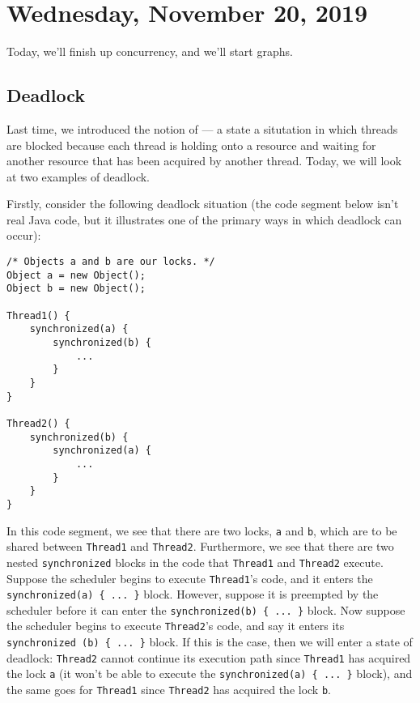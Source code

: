 \section{Wednesday, November 20, 2019}

Today, we'll finish up concurrency, and we'll start graphs.

\subsection{Deadlock}

Last time, we introduced the notion of  --- a state a situtation in which threads are blocked because each thread is holding onto a resource and waiting for another resource that has been acquired by another thread. Today, we will look at two examples of deadlock.

Firstly, consider the following deadlock situation (the code segment below isn't real Java code, but it illustrates one of the primary ways in which deadlock can occur):

\begin{lstlisting}
/* Objects a and b are our locks. */
Object a = new Object();
Object b = new Object();

Thread1() {
    synchronized(a) {
        synchronized(b) {
            ...
        }
    }
}

Thread2() {
    synchronized(b) {
        synchronized(a) {
            ...
        }
    }
}
\end{lstlisting}

In this code segment, we see that there are two locks, \verb!a! and \verb!b!, which are to be shared between \verb!Thread1! and \verb!Thread2!. Furthermore, we see that there are two nested \verb!synchronized! blocks in the code that \verb!Thread1! and \verb!Thread2! execute. Suppose the scheduler begins to execute \verb!Thread1!'s code, and it enters the \verb!synchronized(a) { ... }! block. However, suppose it is preempted by the scheduler before it can enter the \verb!synchronized(b) { ... }! block. Now suppose the scheduler begins to execute \verb!Thread2!'s code, and say it enters its \verb!synchronized (b) { ... }! block. If this is the case, then we will enter a state of deadlock: \verb!Thread2! cannot continue its execution path since \verb!Thread1! has acquired the lock \verb!a! (it won't be able to execute the \verb!synchronized(a) { ... }! block), and the same goes for \verb!Thread1! since \verb!Thread2! has acquired the lock \verb!b!.  


